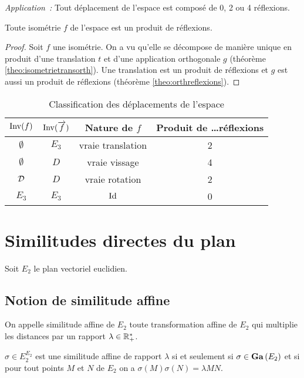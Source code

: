 \emph{Application~:} Tout déplacement de l'espace est composé de 0, 2 ou 4 réflexions.

\begin{cor}
  Toute isométrie \(f\) de l'espace est un produit de réflexions.
\end{cor}
\begin{proof}
  Soit \(f\) une isométrie. On a vu qu'elle se décompose de manière unique en produit d'une translation \(t\) et d'une application orthogonale \(g\) (théorème
  \ref{theo:isometrietransorth}). Une translation est un produit de réflexions et \(g\) est aussi un produit de réflexions (théorème
  \ref{theo:orthreflexions}).
\end{proof}

\begin{table}
  \centering
  \begin{tabular}{|c|c|c|c|}\hline
    \(\operatorname{Inv}(f)\) & \(\operatorname{Inv}(\overrightarrow{f})\) & Nature de \(f\) & Produit de \ldots réflexions \\ \hline
    \(\emptyset\) & \(E_3\) & vraie translation & 2 \\
    \(\emptyset\) & \(D\) & vraie vissage & 4 \\
    \(\mathcal{D}\) & \(D\)& vraie rotation & 2 \\
    \(E_3\) & \(E_3\) & \(\operatorname{Id}\) & 0 \\ \hline
  \end{tabular}
  \caption{Classification des déplacements de l'espace}
  \label{tab:classdéplacementsespace}
\end{table}

\section{Similitudes directes du plan}

Soit \(E_2\) le plan vectoriel euclidien.

\subsection{Notion de similitude affine}

\begin{defdef}
  On appelle similitude affine de \(E_2\) toute transformation affine de \(E_2\) qui multiplie les distances par un rapport \(\lambda \in \mathbb{R}_{+}^{*}\).

  \(\sigma \in E_2^{E_2}\) est une similitude affine de rapport \(\lambda\) si et seulement si \(\sigma \in \mathbf{Ga}\left(E_2\right)\) et si pour tout points \(M\) et \(N\) de \(E_2\) on a \(\sigma(M)\sigma(N)=\lambda MN\).
\end{defdef}


